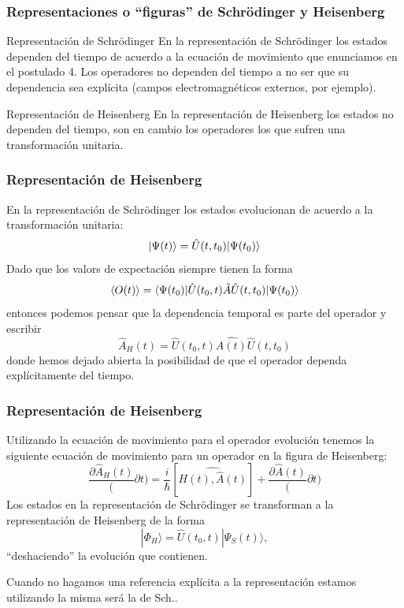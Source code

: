 \documentclass{beamer}
\begin{document}
\begin{frame}
    \frametitle{Representaciones o ``figuras'' de Schrödinger y Heisenberg}
    
    \begin{block}{Representación de Schrödinger}
        En la representación de Schrödinger los estados dependen del tiempo de acuerdo a la ecuación de movimiento que enunciamos en el postulado 4. Los operadores no dependen del tiempo a no ser que su dependencia sea explícita (campos electromagnéticos externos, por ejemplo).
    \end{block}
    \begin{block}{Representación de Heisenberg}
        En la representación de Heisenberg los estados no dependen del tiempo, son en cambio los operadores los que sufren una transformación unitaria.
    \end{block}

    
\end{frame}

\begin{frame}
    \frametitle{Representación de Heisenberg}
    En la representación de Schrödinger los estados evolucionan de acuerdo a la transformación unitaria:
    $$| \Psi(t) \rangle=\hat{U}(t,t_0)| \Psi(t_0) \rangle$$
    Dado que los valors de expectación siempre tienen la forma
    $$\langle O(t) \rangle = \langle \Psi(t_0) |\hat{U}(t_0,t)\hat{A}\hat{U}(t,t_0)| \Psi(t_0) \rangle$$
    entonces podemos pensar que la dependencia temporal es parte del operador y escribir
    $$\hat{A}_H(t)=\hat{U}(t_0,t)\hat{A(t)}\hat{U}(t,t_0)$$
    donde hemos dejado abierta la posibilidad de que el operador dependa explícitamente del tiempo.
    
\end{frame}

\begin{frame}
    \frametitle{Representación de Heisenberg}
    Utilizando la ecuación de movimiento para el operador evolución tenemos la siguiente ecuación de movimiento para un operador en la figura de Heisenberg:
    $$\frac{\partial \hat{A}_H(t)}(\partial t) = \frac{i}{\hbar}[\hat{H(t),\hat{A}(t)}] + \frac{\partial \hat{A}(t)}(\partial t)$$
    Los estados en la representación de Schrödinger se transforman a la representación de Heisenberg de la forma
    $$|\Phi_H\rangle=\hat{U}(t_0,t)|\Psi_S (t)\rangle,$$
    ``deshaciendo'' la evolución que contienen.

    Cuando no hagamos una referencia explícita a la representación estamos utilizando la misma será la de Sch..
\end{frame}
\end{document}

